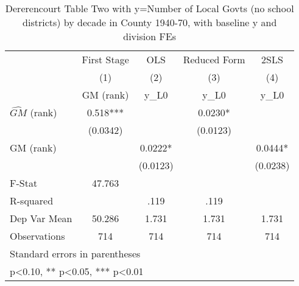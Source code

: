 \begin{table}[htbp]\centering
\def\sym#1{\ifmmode^{#1}\else\(^{#1}\)\fi}
\caption{Dererencourt Table Two with y=Number of Local Govts (no school districts) by decade in County 1940-70, with baseline y and division FEs}
\begin{tabular}{l*{4}{c}}
\toprule
                    & First Stage   &         OLS   &Reduced Form   &        2SLS   \\
                    &\multicolumn{1}{c}{(1)}&\multicolumn{1}{c}{(2)}&\multicolumn{1}{c}{(3)}&\multicolumn{1}{c}{(4)}\\
                    &\multicolumn{1}{c}{GM  (rank)}&\multicolumn{1}{c}{y\_L0}&\multicolumn{1}{c}{y\_L0}&\multicolumn{1}{c}{y\_L0}\\
\midrule
$\hat{GM}$ (rank)   &       0.518***&               &      0.0230*  &               \\
                    &    (0.0342)   &               &    (0.0123)   &               \\
\addlinespace
GM  (rank)          &               &      0.0222*  &               &      0.0444*  \\
                    &               &    (0.0123)   &               &    (0.0238)   \\
\midrule
F-Stat              &      47.763   &               &               &               \\
R-squared           &               &        .119   &        .119   &               \\
Dep Var Mean        &      50.286   &       1.731   &       1.731   &       1.731   \\
Observations        &         714   &         714   &         714   &         714   \\
\bottomrule
\multicolumn{5}{l}{\footnotesize Standard errors in parentheses}\\
\multicolumn{5}{l}{\footnotesize * p<0.10, ** p<0.05, *** p<0.01}\\
\end{tabular}
\end{table}
